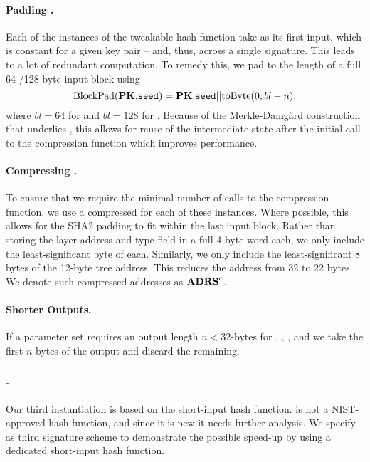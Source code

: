    \paragraph{Padding \pseed.} Each of the instances of the tweakable hash function take \pseed as its first input, which is constant for a given key pair -- and, thus, across a single signature.
   This leads to a lot of redundant computation. To remedy this, we pad \pseed to the length of a full 64-/128-byte \shatwo input block using
  \begin{equation*}
      \text{BlockPad}(\mathbf{PK}.\texttt{seed}) = \mathbf{PK}.\texttt{seed} || \text{toByte}(0, bl - n).
   \end{equation*}
   where $bl= 64$ for \shatwofs and $bl = 128$ for \shatwofivetwelve.
   Because of the Merkle-Damg\aa{}rd construction that underlies \shatwo, this allows for reuse of the intermediate \shatwo state after the initial call to the compression function
   which improves performance.

   \paragraph{Compressing \adrs.} To ensure that we require the minimal number of calls to the \shatwo compression function, we use a compressed \adrs for each of these instances. Where possible, this allows for the SHA2 padding to fit within the last input block. Rather than storing the layer address and type field in a full 4-byte word each, we only include the least-significant byte of each. Similarly, we only include the least-significant 8 bytes of the 12-byte tree address. This reduces the address from 32 to 22 bytes. We denote such compressed addresses as $\textbf{ADRS}^{c}$.

   \paragraph{Shorter Outputs.} If a parameter set requires an
   output length $n < 32$-bytes for \sphincsF, \sphincsH, \sphincsPRF, and
   \sphincsPRFmsg we take the first $n$ bytes of the output and discard the
   remaining.

\subsubsection{\spx-\haraka}
   Our third instantiation is based on the \haraka short-input hash function.
   \haraka is not a NIST-approved hash function,
   and since it is new it needs further analysis.
   We specify \spx-\haraka as
   third signature scheme to demonstrate the possible speed-up by using a
   dedicated short-input hash function.

